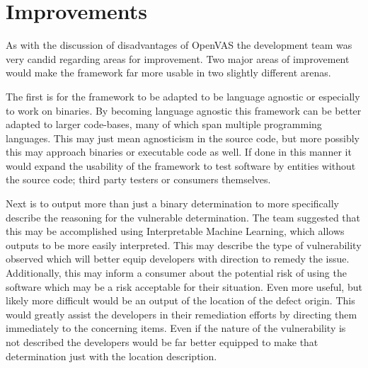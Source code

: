 \documentclass[]{article}
\begin{document}
\section{Improvements}

As with the discussion of disadvantages of OpenVAS the development team was very candid regarding areas for improvement.
Two major areas of improvement would make the framework far more usable in two slightly different arenas.

The first is for the framework to be adapted to be language agnostic or especially to work on binaries.
By becoming language agnostic this framework can be better adapted to larger code-bases, many of which span multiple programming languages. 
This may just mean agnosticism in the source code, but more possibly this may approach binaries or executable code as well.
If done in this manner it would expand the usability of the framework to test software by entities without the source code; third party testers or consumers themselves.

Next is to output more than just a binary determination to more specifically describe the reasoning for the vulnerable determination.
The team suggested that this may be accomplished using Interpretable Machine Learning, which allows outputs to be more easily interpreted.
This may describe the type of vulnerability observed which will better equip developers with direction to remedy the issue.
Additionally, this may inform a consumer about the potential risk of using the software which may be a risk acceptable for their situation.
Even more useful, but likely more difficult would be an output of the location of the defect origin.
This would greatly assist the developers in their remediation efforts by directing them immediately to the concerning items.
Even if the nature of the vulnerability is not described the developers would be far better equipped to make that determination just with the location description.


\clearpage


\end{document}
